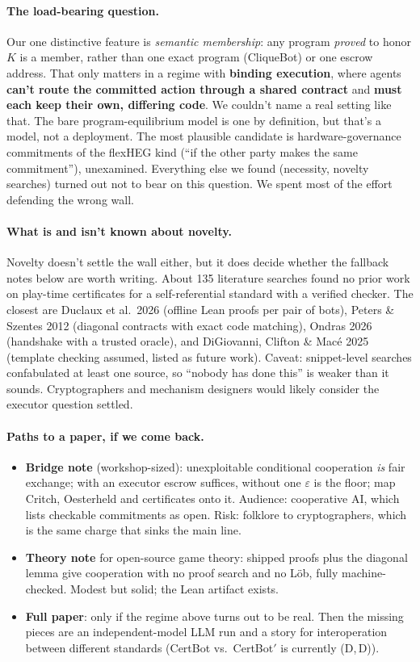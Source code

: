 \documentclass[11pt]{article}
\begin{document}
\paragraph{The load-bearing question.}
Our one distinctive feature is \emph{semantic membership}: any program \emph{proved} to honor $K$ is a member, rather than one exact program (CliqueBot) or one escrow address. That only matters in a regime with \textbf{binding execution}, where agents \textbf{can't route the committed action through a shared contract} and \textbf{must each keep their own, differing code}. We couldn't name a real setting like that. The bare program-equilibrium model is one by definition, but that's a model, not a deployment. The most plausible candidate is hardware-governance commitments of the flexHEG kind (``if the other party makes the same commitment''), unexamined. Everything else we found (necessity, novelty searches) turned out not to bear on this question. We spent most of the effort defending the wrong wall.

\paragraph{What is and isn't known about novelty.} Novelty doesn't settle the wall either, but it does decide whether the fallback notes below are worth writing.
About 135 literature searches found no prior work on play-time certificates for a self-referential standard with a verified checker. The closest are Duclaux et al.\ 2026 (offline Lean proofs per pair of bots), Peters \& Szentes 2012 (diagonal contracts with exact code matching), Ondras 2026 (handshake with a trusted oracle), and DiGiovanni, Clifton \& Macé 2025 (template checking assumed, listed as future work). Caveat: snippet-level searches confabulated at least one source, so ``nobody has done this'' is weaker than it sounds. Cryptographers and mechanism designers would likely consider the executor question settled.

\paragraph{Paths to a paper, if we come back.}
\begin{itemize}
\item \textbf{Bridge note} (workshop-sized): unexploitable conditional cooperation \emph{is} fair exchange; with an executor escrow suffices, without one $\varepsilon$ is the floor; map Critch, Oesterheld and certificates onto it. Audience: cooperative AI, which lists checkable commitments as open. Risk: folklore to cryptographers, which is the same charge that sinks the main line.
\item \textbf{Theory note} for open-source game theory: shipped proofs plus the diagonal lemma give cooperation with no proof search and no Löb, fully machine-checked. Modest but solid; the Lean artifact exists.
\item \textbf{Full paper}: only if the regime above turns out to be real. Then the missing pieces are an independent-model LLM run and a story for interoperation between different standards (CertBot vs.\ CertBot$'$ is currently (D,\,D)).
\end{itemize}
\end{document}
